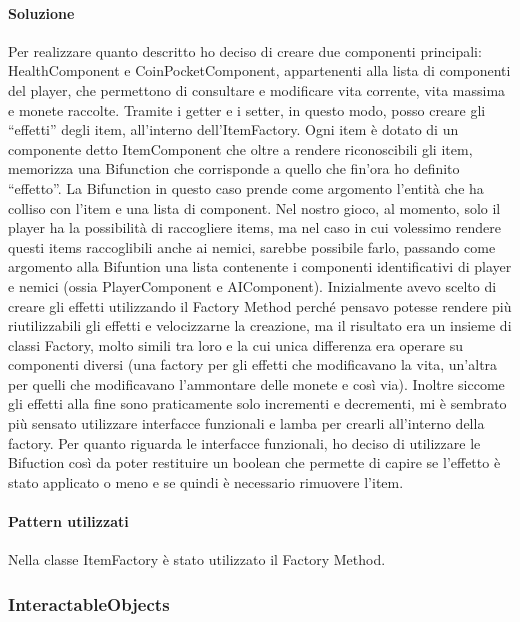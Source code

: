 \documentclass[a4paper,12pt]{report}
\begin{document}
\paragraph*{Soluzione}
	Per realizzare quanto descritto ho deciso di creare due componenti principali: HealthComponent e CoinPocketComponent, appartenenti alla lista di componenti del player, che permettono di consultare e modificare vita corrente, vita massima e monete raccolte. Tramite i getter e i setter, in questo modo, posso creare gli “effetti” degli item, all'interno dell'ItemFactory. 
	Ogni item è dotato di un componente detto ItemComponent che oltre a rendere riconoscibili gli item, memorizza una Bifunction che corrisponde a quello che fin'ora ho definito “effetto”. La Bifunction in questo caso prende come argomento l'entità che ha colliso con l'item e una lista di component. Nel nostro gioco, al momento, solo il player ha la possibilità di raccogliere items, ma nel caso in cui volessimo rendere questi items raccoglibili anche ai nemici, sarebbe possibile farlo, passando come argomento alla Bifuntion una lista contenente i componenti identificativi di player e nemici (ossia PlayerComponent e AIComponent).
	Inizialmente avevo scelto di creare gli effetti utilizzando il Factory Method perché pensavo potesse rendere più riutilizzabili gli effetti e velocizzarne la creazione, ma il risultato era un insieme di classi Factory, molto simili tra loro e la cui unica differenza era operare su componenti diversi (una factory per gli effetti che modificavano la vita, un'altra per quelli che modificavano l'ammontare delle monete e così via).
	Inoltre siccome gli effetti alla fine sono praticamente solo incrementi e decrementi, mi è sembrato più sensato utilizzare interfacce funzionali e lamba per crearli all'interno della factory. 
	Per quanto riguarda le interfacce funzionali, ho deciso di utilizzare le Bifuction così da poter restituire un boolean che permette di capire se l'effetto è stato applicato o meno e se quindi è necessario rimuovere l'item.

\paragraph*{Pattern utilizzati}
	Nella classe ItemFactory è stato utilizzato il Factory Method.

\subsubsection*{InteractableObjects}
\end{document}
